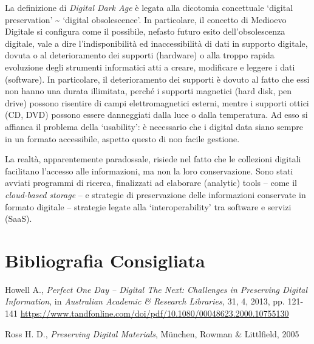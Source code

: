 La definizione di \emph{Digital Dark Age} è legata alla dicotomia
concettuale `digital preservation' \textasciitilde{} `digital
obsolescence'. In particolare, il concetto di Medioevo Digitale si
configura come il possibile, nefasto futuro esito dell'obsolescenza
digitale, vale a dire l'indisponibilità ed inaccessibilità di dati in
supporto digitale, dovuta o al deterioramento dei supporti (hardware) o
alla troppo rapida evoluzione degli strumenti informatici atti a creare,
modificare e leggere i dati (software). In particolare, il
deterioramento dei supporti è dovuto al fatto che essi non hanno una
durata illimitata, perché i supporti magnetici (hard disk, pen drive)
possono risentire di campi elettromagnetici esterni, mentre i supporti
ottici (CD, DVD) possono essere danneggiati dalla luce o dalla
temperatura. Ad esso si affianca il problema della `usability': è
necessario che i digital data siano sempre in un formato accessibile,
aspetto questo di non facile gestione.

La realtà, apparentemente paradossale, risiede nel fatto che le
collezioni digitali facilitano l'accesso alle informazioni, ma non la
loro conservazione. Sono stati avviati programmi di ricerca, finalizzati
ad elaborare (analytic) tools -- come il \emph{cloud-based storage} -- e
strategie di preservazione delle informazioni conservate in formato
digitale -- strategie legate alla `interoperability' tra software e
servizi (SaaS).

\section*{Bibliografia Consigliata}
{\parindent0pt 
Howell A., \emph{Perfect One Day -- Digital The Next: Challenges in
Preserving Digital Information}, in \emph{Australian Academic \&
Research Libraries,} 31, 4, 2013, pp. 121-141
\url{https://www.tandfonline.com/doi/pdf/10.1080/00048623.2000.10755130}

Ross H. D., \emph{Preserving Digital Materials}, München, Rowman \&
Littlfield, 2005
}
